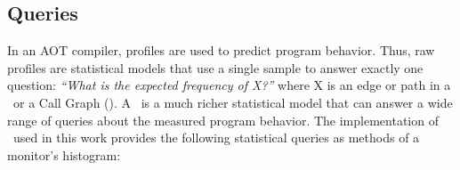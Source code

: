 

\subsection{Queries}
\label{cp:queries}

In an AOT compiler, profiles are used to predict program behavior.
Thus, raw profiles are statistical models that use a single sample to
answer exactly one question: {\em ``What is the expected frequency of
  X?''}  where X is an edge or path in a \CFG\ or a Call Graph (\CG).
A \CP\ is a much richer statistical model that can answer a wide range
of queries about the measured program behavior.  The implementation of
\CP\ used in this work provides the following statistical queries as
methods of a monitor's histogram:
